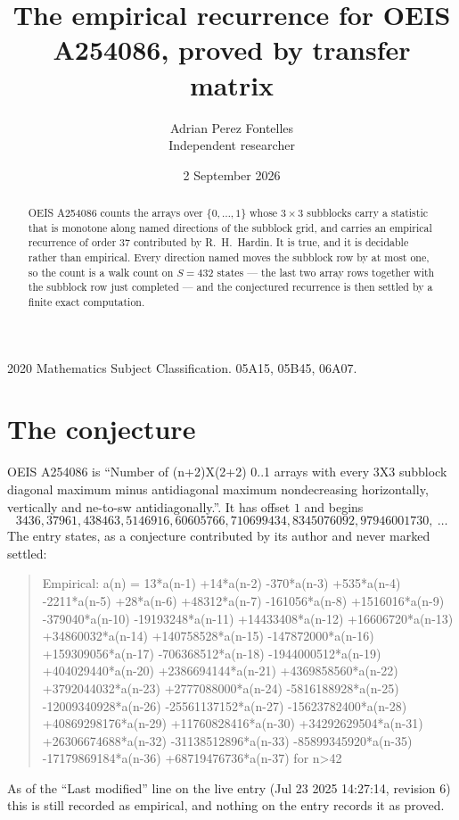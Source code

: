 \documentclass[11pt,a4paper]{article}
\title{The empirical recurrence for OEIS A254086, proved by transfer matrix}
\author{Adrian Perez Fontelles\\ \small Independent researcher}
\date{2 September 2026}
\theoremstyle{plain}
\theoremstyle{definition}
\begin{document}
\maketitle

\begin{abstract}
OEIS A254086 counts the arrays over $\{0,\dots,1\}$ whose $3\times3$ subblocks carry a
statistic that is monotone along named directions of the subblock grid, and carries an
empirical recurrence of order $37$ contributed by R.~H.~Hardin. It is true, and it is
decidable rather than empirical. Every direction named moves the subblock row by at most one,
so the count is a walk count on $S=432$ states --- the last two array rows together with the
subblock row just completed --- and the conjectured recurrence is then settled by a finite
exact computation.
\end{abstract}

\noindent\small 2020 Mathematics Subject Classification. 05A15, 05B45, 06A07.\normalsize

\section{The conjecture}

OEIS A254086 is ``Number of (n+2)X(2+2) 0..1 arrays with every 3X3 subblock diagonal maximum minus antidiagonal maximum nondecreasing horizontally, vertically and ne-to-sw antidiagonally.''. It has offset $1$ and begins
\[
3436, 37961, 438463, 5146916, 60605766, 710699434, 8345076092, 97946001730,\ \dots
\]
The entry states, as a conjecture contributed by its author and never marked settled:
\begin{quote}
Empirical: a(n) = 13*a(n-1) +14*a(n-2) -370*a(n-3) +535*a(n-4) -2211*a(n-5) +28*a(n-6) +48312*a(n-7) -161056*a(n-8) +1516016*a(n-9) -379040*a(n-10) -19193248*a(n-11) +14433408*a(n-12) +16606720*a(n-13) +34860032*a(n-14) +140758528*a(n-15) -147872000*a(n-16) +159309056*a(n-17) -706368512*a(n-18) -1944000512*a(n-19) +404029440*a(n-20) +2386694144*a(n-21) +4369858560*a(n-22) +3792044032*a(n-23) +2777088000*a(n-24) -5816188928*a(n-25) -12009340928*a(n-26) -25561137152*a(n-27) -15623782400*a(n-28) +40869298176*a(n-29) +11760828416*a(n-30) +34292629504*a(n-31) +26306674688*a(n-32) -31138512896*a(n-33) -85899345920*a(n-35) -17179869184*a(n-36) +68719476736*a(n-37) for n>42
\end{quote}
As of the ``Last modified'' line on the live entry (Jul 23 2025 14:27:14, revision 6) this is still
recorded as empirical, and nothing on the entry records it as proved.
\end{document}
